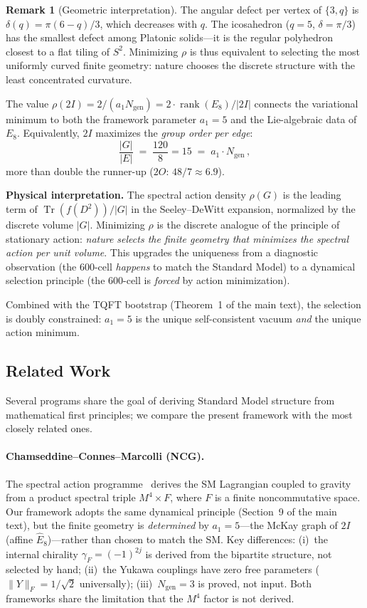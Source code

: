 \documentclass[12pt,a4paper]{article}
\theoremstyle{definition}
\newtheorem{remark}{Remark}
\begin{document}
\begin{remark}[Geometric interpretation]
The angular defect per vertex of $\{3,q\}$ is $\delta(q) = \pi(6-q)/3$, which decreases with $q$.  The icosahedron ($q = 5$, $\delta = \pi/3$) has the smallest defect among Platonic solids---it is the regular polyhedron closest to a flat tiling of $S^2$.  Minimizing $\rho$ is thus equivalent to selecting the most uniformly curved finite geometry: nature chooses the discrete structure with the least concentrated curvature.
\end{remark}

\noindent The value $\rho(2I) = 2/(a_1 N_{\mathrm{gen}}) = 2 \cdot \operatorname{rank}(E_8)/|2I|$ connects the variational minimum to both the framework parameter $a_1 = 5$ and the Lie-algebraic data of $E_8$.  Equivalently, $2I$ maximizes the \emph{group order per edge}:
\[
\frac{|G|}{|E|} \;=\; \frac{120}{8} = 15 \;=\; a_1 \cdot N_{\mathrm{gen}}\,,
\]
more than double the runner-up ($2O$: $48/7 \approx 6.9$).

\textbf{Physical interpretation.}  The spectral action density $\rho(G)$ is the leading term of $\operatorname{Tr}(f(D^2))/|G|$ in the Seeley--DeWitt expansion, normalized by the discrete volume $|G|$.  Minimizing $\rho$ is the discrete analogue of the principle of stationary action: \emph{nature selects the finite geometry that minimizes the spectral action per unit volume}.  This upgrades the uniqueness from a diagnostic observation (the 600-cell \emph{happens} to match the Standard Model) to a dynamical selection principle (the 600-cell is \emph{forced} by action minimization).

Combined with the TQFT bootstrap (Theorem~1 of the main text), the selection is doubly constrained: $a_1 = 5$ is the unique self-consistent vacuum \emph{and} the unique action minimum.

\subsection{Related Work}

Several programs share the goal of deriving Standard Model structure from mathematical first principles; we compare the present framework with the most closely related ones.

\paragraph{Chamseddine--Connes--Marcolli (NCG).}
The spectral action programme~\cite{chamseddine1997,ccm2007} derives the SM Lagrangian coupled to gravity from a product spectral triple $M^4 \times F$, where $F$ is a finite noncommutative space.  Our framework adopts the same dynamical principle (Section~9 of the main text), but the finite geometry is \emph{determined} by $a_1 = 5$---the McKay graph of $2I$ (affine $\hat{E}_8$)---rather than chosen to match the SM.  Key differences: (i)~the internal chirality $\gamma_F = (-1)^{2j}$ is derived from the bipartite structure, not selected by hand; (ii)~the Yukawa couplings have zero free parameters ($\|Y\|_F = 1/\sqrt{2}$ universally); (iii)~$N_{\text{gen}} = 3$ is proved, not input.  Both frameworks share the limitation that the $M^4$ factor is not derived.
\end{document}
